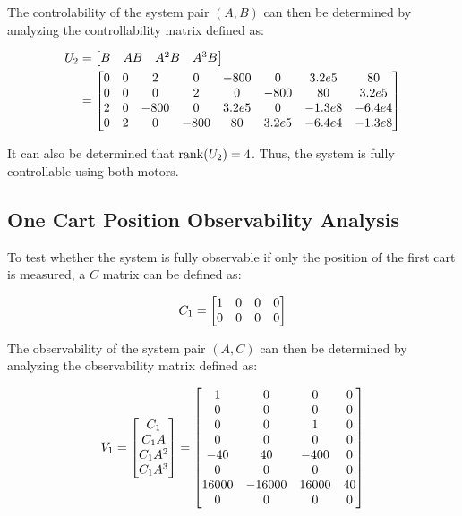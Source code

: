 \documentclass[]{article}
\begin{document}
		The controlability of the system pair $(A, B)$ can then be determined by analyzing the controllability matrix defined as:
		
		\begin{equation}
			\begin{aligned}
				U_2 &= \mqty[B		&AB				&A^2B			&A^3B]\\
					&= \mqty[0	&0	&2		&0		&-800	&0		&3.2e5	&80\\
							 0	&0	&0		&2		&0		&-800	&80		&3.2e5\\
						 	 2	&0	&-800	&0	 	&3.2e5	&0		&-1.3e8	&-6.4e4\\
							 0	&2	&0		&-800	&80		&3.2e5	&-6.4e4	&-1.3e8]
			\end{aligned}
		\end{equation}
		
		It can also be determined that $\rank(U_2) = 4$. Thus, the system is fully controllable using both motors.
	
	\newpage
	\subsection{One Cart Position Observability Analysis}
		To test whether the system is fully observable if only the position of the first cart is measured, a $C$ matrix can be defined as:
		
		\begin{equation}
			C_1 = \mqty[1	&0	&0	&0\\
					  	0	&0	&0	&0]
		\end{equation}

		The observability of the system pair $(A, C)$ can then be determined by analyzing the observability matrix defined as:
		
		\begin{equation}
			V_1 = \mqty[C_1\\ C_1A\\ C_1A^2\\ C_1A^3]
				= \mqty[1		&0		&0		&0\\
						0		&0		&0		&0\\
						0		&0		&1		&0\\
						0		&0		&0		&0\\
						-40		&40		&-400	&0\\
						0		&0		&0		&0\\
						16000	&-16000	&16000	&40\\
						0		&0		&0		&0]
		\end{equation}
		
\end{document}
